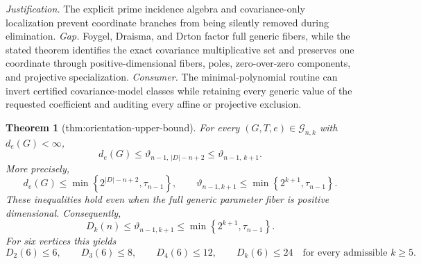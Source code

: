 \documentclass{article}
\newtheorem{theorem}{Theorem}
\begin{document}
\par\smallskip\noindent \textit{Justification.} The explicit prime incidence algebra and covariance-only localization prevent coordinate branches from being silently removed during elimination. \textit{Gap.} Foygel, Draisma, and Drton factor full generic fibers, while the stated theorem identifies the exact covariance multiplicative set and preserves one coordinate through positive-dimensional fibers, poles, zero-over-zero components, and projective specialization. \textit{Consumer.} The minimal-polynomial routine can invert certified covariance-model classes while retaining every generic value of the requested coefficient and auditing every affine or projective exclusion.

\begin{theorem}[thm:orientation-upper-bound]\label{thm:orientation-upper-bound}
For every \((G,T,e)\in\mathcal G_{n,k}\) with \(d_e(G)<\infty\),
\[
 d_e(G)
 \leq \vartheta_{n-1,\,|D|-n+2}
 \leq \vartheta_{n-1,\,k+1}.
\]
More precisely,
\[
 d_e(G)\leq\min\!\left\{2^{|D|-n+2},\tau_{n-1}\right\},
 \qquad
 \vartheta_{n-1,k+1}\leq\min\!\left\{2^{k+1},\tau_{n-1}\right\}.
\]
These inequalities hold even when the full generic parameter fiber is positive dimensional.  Consequently,
\[
 D_k(n)\leq\vartheta_{n-1,k+1}\leq\min\!\left\{2^{k+1},\tau_{n-1}\right\}.
\]
For six vertices this yields
\[
 D_2(6)\leq6,\qquad D_3(6)\leq8,\qquad D_4(6)\leq12,
 \qquad D_k(6)\leq24\quad\text{for every admissible }k\geq5.
\]
\end{theorem}
\end{document}
